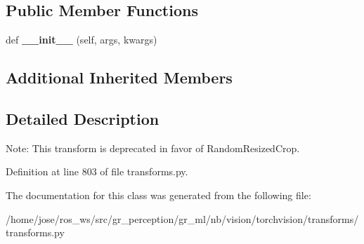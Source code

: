 \subsection*{Public Member Functions}
\begin{DoxyCompactItemize}
\item 
\mbox{\label{classtorchvision_1_1transforms_1_1transforms_1_1RandomSizedCrop_a75fdfffa1348e684f02aa00d3369755e}} 
def {\bfseries \+\_\+\+\_\+init\+\_\+\+\_\+} (self, args, kwargs)
\end{DoxyCompactItemize}
\subsection*{Additional Inherited Members}


\subsection{Detailed Description}
\begin{DoxyVerb}Note: This transform is deprecated in favor of RandomResizedCrop.
\end{DoxyVerb}
 

Definition at line 803 of file transforms.\+py.



The documentation for this class was generated from the following file\+:\begin{DoxyCompactItemize}
\item 
/home/jose/ros\+\_\+ws/src/gr\+\_\+perception/gr\+\_\+ml/nb/vision/torchvision/transforms/transforms.\+py\end{DoxyCompactItemize}
